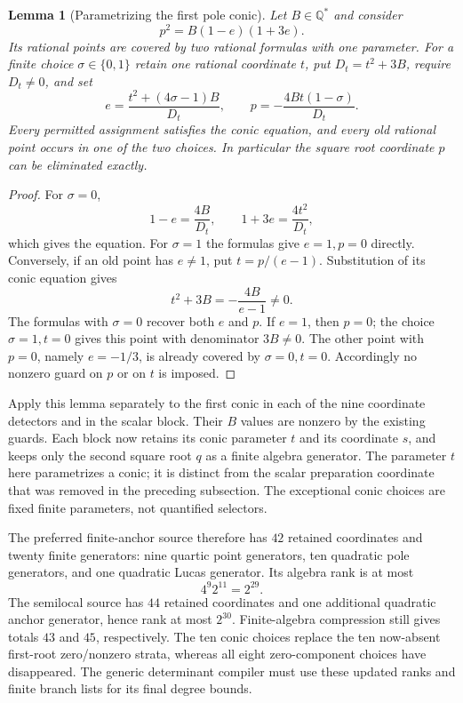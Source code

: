 \documentclass[11pt]{article}
\newtheorem{lemma}[theorem]{Lemma}
\theoremstyle{definition}
\begin{document}
\begin{lemma}[Parametrizing the first pole conic]
\label{lem:pole-conic-parametrization}
Let $B\in\mathbb Q^*$ and consider
\[
                        p^2=B(1-e)(1+3e).
\]
Its rational points are covered by two rational formulas with
one parameter.  For a finite choice $\sigma\in\{0,1\}$ retain
one rational coordinate $t$, put $D_t=t^2+3B$, require $D_t\ne0$,
and set
\[
 e=\frac{t^2+(4\sigma-1)B}{D_t},
 \qquad p=-\frac{4Bt(1-\sigma)}{D_t}.
\]
Every permitted assignment satisfies the conic equation, and every
old rational point occurs in one of the two choices.  In particular
the square root coordinate $p$ can be eliminated exactly.
\end{lemma}
\begin{proof}
For $\sigma=0$,
\[
                 1-e=\frac{4B}{D_t},\qquad
                 1+3e=\frac{4t^2}{D_t},
\]
which gives the equation.  For $\sigma=1$ the formulas give
$e=1,p=0$ directly.  Conversely, if an old point has $e\ne1$,
put $t=p/(e-1)$.  Substitution of its conic equation gives
\[
                       t^2+3B=-\frac{4B}{e-1}\ne0.
\]
The formulas with $\sigma=0$ recover both $e$ and $p$.  If
$e=1$, then $p=0$; the choice $\sigma=1,t=0$ gives this point
with denominator $3B\ne0$.  The other point with $p=0$,
namely $e=-1/3$, is already covered by $\sigma=0,t=0$.
Accordingly no nonzero guard on $p$ or on $t$ is imposed.
\end{proof}

Apply this lemma separately to the first conic in each of the
nine coordinate detectors and in the scalar block.  Their
$B$ values are nonzero by the existing guards.  Each block now
retains its conic parameter $t$ and its coordinate $s$, and
keeps only the second square root $q$ as a finite algebra
generator.  The parameter $t$ here parametrizes a conic; it
is distinct from the scalar preparation coordinate that was
removed in the preceding subsection.  The exceptional conic
choices are fixed finite parameters, not quantified selectors.

The preferred finite-anchor source therefore has $42$ retained
coordinates and twenty finite generators: nine quartic point
generators, ten quadratic pole generators, and one quadratic
Lucas generator.  Its algebra rank is at most
\[
                         4^9 2^{11}=2^{29}.
\]
The semilocal source has $44$ retained coordinates and one
additional quadratic anchor generator, hence rank at most
$2^{30}$.  Finite-algebra compression still gives totals
$43$ and $45$, respectively.  The ten conic choices replace
the ten now-absent first-root zero/nonzero strata, whereas
all eight zero-component choices have disappeared.  The
generic determinant compiler must use these updated ranks
and finite branch lists for its final degree bounds.
\end{document}

